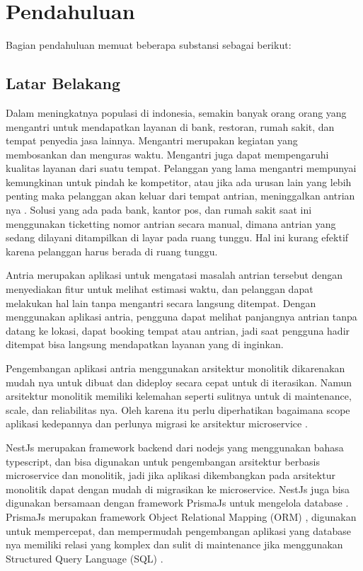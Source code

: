 \chapter{Pendahuluan}
Bagian pendahuluan memuat beberapa substansi sebagai berikut:

\section{Latar Belakang}
Dalam meningkatnya populasi di indonesia, semakin banyak orang orang yang mengantri untuk mendapatkan layanan di bank, restoran, rumah sakit, dan tempat penyedia jasa lainnya. Mengantri merupakan kegiatan yang membosankan dan menguras waktu. Mengantri juga dapat mempengaruhi kualitas layanan dari suatu tempat. Pelanggan yang lama mengantri mempunyai kemungkinan untuk pindah ke kompetitor, atau jika ada urusan lain yang lebih penting maka pelanggan akan keluar dari tempat antrian, meninggalkan antrian nya \cite{khong2017queue}\cite{Ghazal2016}\cite{Uddin2016}. Solusi yang ada pada bank, kantor pos, dan rumah sakit saat ini menggunakan ticketting nomor antrian secara manual, dimana antrian yang sedang dilayani ditampilkan di layar pada ruang tunggu. Hal ini kurang efektif karena pelanggan harus berada di ruang tunggu\cite{Ghazal2016}.

Antria merupakan aplikasi untuk mengatasi masalah antrian tersebut dengan menyediakan fitur untuk melihat estimasi waktu, dan pelanggan dapat melakukan hal lain tanpa mengantri secara langsung ditempat. Dengan menggunakan aplikasi antria, pengguna dapat melihat panjangnya antrian tanpa datang ke lokasi, dapat booking tempat atau antrian, jadi saat pengguna hadir ditempat bisa langsung mendapatkan layanan yang di inginkan.

Pengembangan aplikasi antria menggunakan arsitektur monolitik dikarenakan mudah nya untuk dibuat dan dideploy secara cepat untuk di iterasikan. Namun arsitektur monolitik memiliki kelemahan seperti sulitnya untuk di maintenance, scale, dan reliabilitas nya. Oleh karena itu perlu diperhatikan bagaimana scope aplikasi kedepannya dan perlunya migrasi ke arsitektur microservice \cite{gos2020comparison}.

NestJs merupakan framework backend dari nodejs yang menggunakan bahasa typescript, dan bisa digunakan untuk pengembangan arsitektur berbasis microservice dan monolitik, jadi jika aplikasi dikembangkan pada arsitektur monolitik dapat dengan mudah di migrasikan ke microservice. NestJs juga bisa digunakan bersamaan dengan framework PrismaJs untuk mengelola database \cite{NestJS}. PrismaJs merupakan framework Object Relational Mapping (ORM) \cite{Prisma}, digunakan untuk mempercepat, dan mempermudah pengembangan aplikasi yang database nya memiliki relasi yang komplex dan sulit di maintenance jika menggunakan Structured Query Language (SQL) \cite{Zmaranda2020}.

